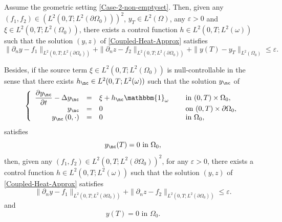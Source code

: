\begin{proposition}
\label{Prop-Approx-Cont-Case2}
Assume the geometric setting \eqref{Case-2-non-emptyset}. Then, given any $(f_1, f_2) \in (L^2(0,T; L^2(\partial \Omega_0)))^2$, $y_T \in L^2(\Omega)$, any $\varepsilon >0$ and $\xi \in L^2(0,T; L^2(\Omega_0))$, there exists a control function $h \in L^2(0,T; L^2(\omega))$ such that the solution $(y,z)$ of \eqref{Coupled-Heat-Approx} satisfies
\begin{equation}
\label{Approx-Cont-Case2}
\| \partial_n y - f_1 \|_{L^2(0,T; L^2(\partial\Omega_0))}
+
\| \partial_n z - f_2 \|_{L^2(0,T; L^2(\partial\Omega_0))}
+
\| y(T) - y_T \|_{L^2(\Omega_0)}
\leq
\varepsilon.
\end{equation}

Besides, if {the source term} $\xi \in L^2(0,T; L^2(\Omega_0))$ is null-controllable in the sense that there exists $h_{\nc} \in L^2(0,T; L^2(\omega))$ such that the solution $y_{\nc}$ of
\begin{equation}
\label{y-nc}
\left\{
\begin{array}{rcll}
\dfrac{\partial y_{\nc}}{\partial t}-\Delta y_{\nc} &=&\xi +h_{\nc} \mathbbm{1}_{\omega}\quad&\text{ in }(0,T) \times \Omega_0,
\\
y_{\nc} &=& 0 &\text{ on }(0,T) \times \partial \Omega_0,
\\
y_{\nc}\left(0,\cdot\right) &=& 0 &\text{ in }\Omega_0,
\end{array}
\right.
\end{equation}
satisfies
\begin{equation}
\label{NC-Assumption}
y_{\nc}(T) = 0 \text{ in } \Omega_0,
\end{equation}
then, given any $(f_1, f_2) \in L^2(0,T; L^2(\partial \Omega_0))^2$, for any $\varepsilon >0$, there exists a control function $h \in L^2(0,T; L^2(\omega))$ such that the solution $(y,z)$ of \eqref{Coupled-Heat-Approx} satisfies
\begin{equation}
\label{Approx-Cont-2}
\| \partial_n y - f_1 \|_{L^2(0,T; L^2(\partial\Omega_0))}
+
\| \partial_n z - f_2 \|_{L^2(0,T; L^2(\partial\Omega_0))}
\leq
\varepsilon.
\end{equation}
and
\begin{equation}
\label{NullControl}
y(T) = 0 \text{ in } \Omega_0.
\end{equation}
\end{proposition}

